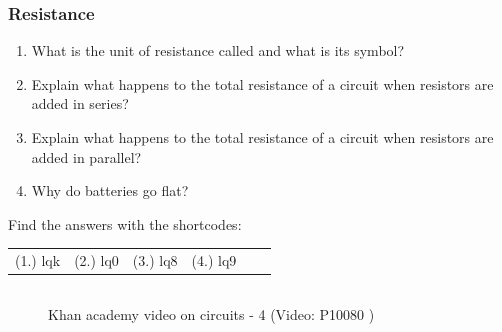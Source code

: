 \label{m38776*secfhsst!!!underscore!!!id1795}
            \subsubsection{  Resistance }
            \nopagebreak
            
          \label{m38776*id67542}\begin{enumerate}[noitemsep, label=\textbf{\arabic*}. ] 
            \label{m38776*uid68}\item What is the unit of resistance called and what is its symbol?         
\label{m38776*uid69}\item Explain what happens to the total resistance of a circuit when resistors are added in series?         
\label{m38776*uid70}\item Explain what happens to the total resistance of a circuit when resistors are added in parallel?         
\label{m38776*uid71}\item Why do batteries go flat?         
\end{enumerate}
        
          

        
      
    




   \label{m38776*sb9871}
\par {} Find the answers with the shortcodes:
 \par \begin{tabular}[h]{cccccc}
 (1.) lqk  &  (2.) lq0  &  (3.) lq8  &  (4.) lq9  & \end{tabular}



            \subsection{ }
            \nopagebreak
            

    \setcounter{subfigure}{0}


	\begin{figure}[H] %
    
        
    \textnormal{Khan academy video on circuits - 4}\vspace{.1in} \nopagebreak
  \label{m38776*yt-media4}\label{m38776*yt-video4}
             { (Video:  P10080 )}
      
      \vspace{2pt}
    \vspace{.1in}
        
    

 \end{figure}   

